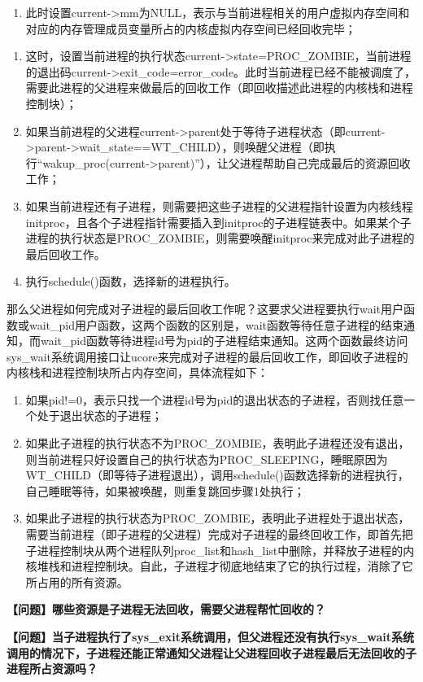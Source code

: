 \begin{enumerate}
\def\labelenumi{\alph{enumi}.}
\setcounter{enumi}{2}
\tightlist
\item
  此时设置current-\textgreater{}mm为NULL，表示与当前进程相关的用户虚拟内存空间和对应的内存管理成员变量所占的内核虚拟内存空间已经回收完毕；
\end{enumerate}

\begin{enumerate}
\def\labelenumi{\arabic{enumi}.}
\setcounter{enumi}{1}
\item
  这时，设置当前进程的执行状态current-\textgreater{}state=PROC\_ZOMBIE，当前进程的退出码current-\textgreater{}exit\_code=error\_code。此时当前进程已经不能被调度了，需要此进程的父进程来做最后的回收工作（即回收描述此进程的内核栈和进程控制块）；
\item
  如果当前进程的父进程current-\textgreater{}parent处于等待子进程状态（即current-\textgreater{}parent-\textgreater{}wait\_state==WT\_CHILD），则唤醒父进程（即执行``wakup\_proc(current-\textgreater{}parent)''），让父进程帮助自己完成最后的资源回收工作；
\item
  如果当前进程还有子进程，则需要把这些子进程的父进程指针设置为内核线程initproc，且各个子进程指针需要插入到initproc的子进程链表中。如果某个子进程的执行状态是PROC\_ZOMBIE，则需要唤醒initproc来完成对此子进程的最后回收工作。
\item
  执行schedule()函数，选择新的进程执行。
\end{enumerate}

那么父进程如何完成对子进程的最后回收工作呢？这要求父进程要执行wait用户函数或wait\_pid用户函数，这两个函数的区别是，wait函数等待任意子进程的结束通知，而wait\_pid函数等待进程id号为pid的子进程结束通知。这两个函数最终访问sys\_wait系统调用接口让ucore来完成对子进程的最后回收工作，即回收子进程的内核栈和进程控制块所占内存空间，具体流程如下：

\begin{enumerate}
\def\labelenumi{\arabic{enumi}.}
\tightlist
\item
  如果pid!=0，表示只找一个进程id号为pid的退出状态的子进程，否则找任意一个处于退出状态的子进程；
\item
  如果此子进程的执行状态不为PROC\_ZOMBIE，表明此子进程还没有退出，则当前进程只好设置自己的执行状态为PROC\_SLEEPING，睡眠原因为WT\_CHILD（即等待子进程退出），调用schedule()函数选择新的进程执行，自己睡眠等待，如果被唤醒，则重复跳回步骤1处执行；
\item
  如果此子进程的执行状态为PROC\_ZOMBIE，表明此子进程处于退出状态，需要当前进程（即子进程的父进程）完成对子进程的最终回收工作，即首先把子进程控制块从两个进程队列proc\_list和hash\_list中删除，并释放子进程的内核堆栈和进程控制块。自此，子进程才彻底地结束了它的执行过程，消除了它所占用的所有资源。
\end{enumerate}

\textbf{【问题】哪些资源是子进程无法回收，需要父进程帮忙回收的？}

\textbf{【问题】当子进程执行了sys\_exit系统调用，但父进程还没有执行sys\_wait系统调用的情况下，子进程还能正常通知父进程让父进程回收子进程最后无法回收的子进程所占资源吗？}
